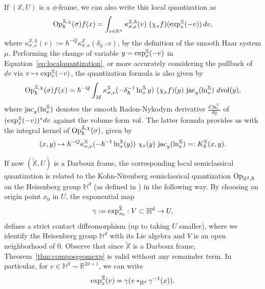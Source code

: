 \documentclass[12pt,a4paper]{amsart}
\theoremstyle{plain}
\theoremstyle{definition}
\theoremstyle{remark}
\numberwithin{equation}{section}
\theoremstyle{definition}
\def\R{{\mathbb R}}%
\def \Op{{\rm Op}}
\def \jac {{\rm jac}}
\def \exp{{\rm exp}}
\def \bX{\mathbb{X}}
\def \Heis{\mathbb{H}}
\numberwithin{equation}{section}
\begin{document}
\vspace{0.25cm}

If $(\bX,U)$ is a $\phi$-frame, we can also write this local quantization as
\begin{equation*}
    \Op_{\hbar}^{\bX,\chi}(\sigma)f(x) = \int_{v \in \R^n}  \kappa_{\sigma,x}^{\bX,\hbar} (v) \ (\chi_x f)(\exp^\bX_x (- v)) \, dv,
\end{equation*}
where $\kappa_{\sigma,x}^{\bX,\hbar}(v) := \hbar^{-Q} \kappa_{\sigma,x}^\bX(\delta_{\hbar^{-1}} v)$, by the definition of the smooth Haar system $\mu$.
Performing the change of variable $y=\exp^\bX_x(-v)$ in Equation~\eqref{eq:localquantization}, or more accurately considering the pullback of $dv$ via $v\mapsto \exp^\bX_x (- v)$, 
the quantization formula is also given by
\begin{equation}\label{eq_int_kernel}
	\Op^{\bX,  \chi}_\hbar(\sigma)f(x)
=\hbar^{-Q}
\int_{M}  \kappa_{\sigma,x}^{\bX} (- \delta_\hbar^{-1} \ln^\bX_x y) \ (\chi_x f)(y)\ \jac_{y} (\ln^\bX_x) \ d{\rm vol}(y),
\end{equation}
where $\jac_{y} (\ln^\bX_x)$ denotes the smooth Radon-Nykodym derivative $\frac{d \ln^\bX_x}{dy} $  of $(\exp^\bX_x (- v))^*dv$ against the volume form ${\rm vol}$.
The latter formula provides us with the integral kernel of $\Op_\hbar^{\bX,\chi}(\sigma)$, given by
\begin{equation}
    \label{eq:integral_kernel}
    (x,y)\mapsto  \hbar^{-Q} \kappa_{\sigma,x}^{\bX} (- \hbar^{-1}  \ln^\bX_x (y)) \ \chi_x (y)\ \jac_{y} (\ln^\bX_x)=:K_\hbar^\bX(x,y).
\end{equation}

\vspace{0.25cm}

If now $(\tilde{\bX},U)$ is a Darboux frame, the corresponding local semiclassical quantization is related to the Kohn-Nirenberg semiclassical quantization $\Op_{\Heis^d,\hbar}$ on the Heisenberg group $\Heis^d$ (as defined in \cite{FL, FKF19, FM, FR}) in the following way. By choosing an origin point $x_0$ in $U$, the exponential map
\begin{equation*}
    \gamma :=\exp_{x_0}^{\tilde{\bX}}: V\subset \Heis^d\rightarrow U, 
\end{equation*}
defines a strict contact diffeomorphism (up to taking $U$ smaller), where we identify the Heisenberg group $\Heis^d$ with its Lie algebra and $V$ is an open neighborhood of $0$. Observe that since $\tilde{\bX}$ is a Darboux frame, Theorem~\ref{thm:composgeomexp} is valid without any remainder term. In particular, for $v\in \Heis^d\sim\R^{2d+1}$, we can write
\begin{equation*}
    \exp_x^{\tilde{\bX}}(v)= \gamma(v*_{\Heis^d}\gamma^{-1}(x)).
\end{equation*}
\end{document}
